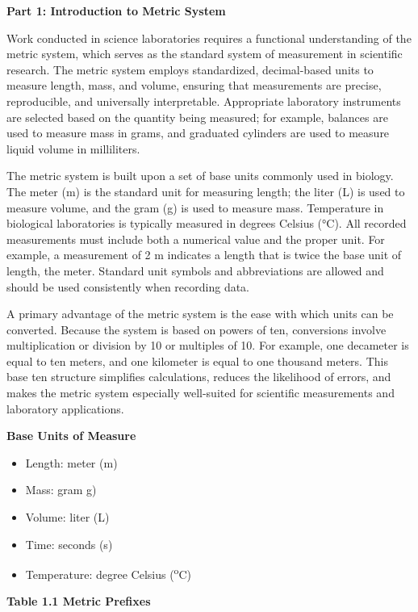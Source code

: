 \documentclass[
  letterpaper,
  DIV=11,
  numbers=noendperiod]{scrreprt}
\begin{document}
\textbf{Part 1: Introduction to Metric System}

Work conducted in science laboratories requires a functional
understanding of the metric system, which serves as the standard system
of measurement in scientific research. The metric system employs
standardized, decimal-based units to measure length, mass, and volume,
ensuring that measurements are precise, reproducible, and universally
interpretable. Appropriate laboratory instruments are selected based on
the quantity being measured; for example, balances are used to measure
mass in grams, and graduated cylinders are used to measure liquid volume
in milliliters.

The metric system is built upon a set of base units commonly used in
biology. The meter (m) is the standard unit for measuring length; the
liter (L) is used to measure volume, and the gram (g) is used to measure
mass. Temperature in biological laboratories is typically measured in
degrees Celsius (°C). All recorded measurements must include both a
numerical value and the proper unit. For example, a measurement of 2 m
indicates a length that is twice the base unit of length, the meter.
Standard unit symbols and abbreviations are allowed and should be used
consistently when recording data.

A primary advantage of the metric system is the ease with which units
can be converted. Because the system is based on powers of ten,
conversions involve multiplication or division by 10 or multiples of 10.
For example, one decameter is equal to ten meters, and one kilometer is
equal to one thousand meters. This base ten structure simplifies
calculations, reduces the likelihood of errors, and makes the metric
system especially well-suited for scientific measurements and laboratory
applications.

\textbf{Base Units of Measure}

\begin{itemize}
\item
  Length: meter (m)
\item
  Mass: gram g)
\item
  Volume: liter (L)
\item
  Time: seconds (s)
\item
  Temperature: degree Celsius (\textsuperscript{o}C)
\end{itemize}

\textbf{Table 1.1 Metric Prefixes}
\end{document}
